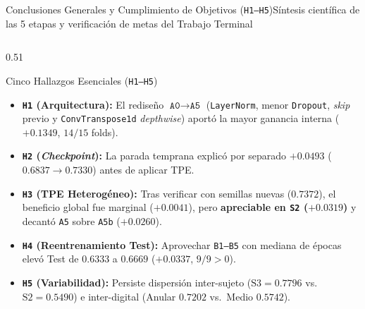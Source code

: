 
\begin{frame}{Conclusiones Generales y Cumplimiento de Objetivos (\texttt{H1--H5})}{S\'intesis cient\'ifica de las 5 etapas y verificaci\'on de metas del Trabajo Terminal}
  \begin{columns}[T,onlytextwidth]
    \begin{column}{0.51\textwidth}
      \scriptsize
      \begin{block}{Cinco Hallazgos Esenciales (\texttt{H1--H5})}
        \begin{itemize}\setlength{\itemsep}{2pt}
          \item \textbf{\texttt{H1} (Arquitectura):} El redise\~no $\texttt{A0}\to\texttt{A5}$ (\texttt{LayerNorm}, menor \texttt{Dropout}, \textit{skip} previo y \texttt{ConvTranspose1d} \textit{depthwise}) aport\'o la mayor ganancia interna ($\mathbf{+0.1349}$, $14/15$ folds).
          \item \textbf{\texttt{H2} (\textit{Checkpoint}):} La parada temprana explic\'o por separado $\mathbf{+0.0493}$ ($0.6837\to 0.7330$) antes de aplicar TPE.
          \item \textbf{\texttt{H3} (TPE Heterog\'eneo):} Tras verificar con semillas nuevas ($0.7372$), el beneficio global fue marginal ($\mathbf{+0.0041}$), pero \textbf{apreciable en \texttt{S2} ($\mathbf{+0.0319}$)} y decant\'o \texttt{A5} sobre \texttt{A5b} ($+0.0260$).
          \item \textbf{\texttt{H4} (Reentrenamiento Test):} Aprovechar \texttt{B1--B5} con mediana de \'epocas elev\'o Test de $0.6333$ a $\mathbf{0.6669}$ ($\mathbf{+0.0337}$, $9/9 > 0$).
          \item \textbf{\texttt{H5} (Variabilidad):} Persiste dispersi\'on inter-sujeto ($\text{S3}=0.7796$ vs.\ $\text{S2}=0.5490$) e inter-digital (Anular $0.7202$ vs.\ Medio $0.5742$).
        \end{itemize}
      \end{block}
    \end{column}


\end{columns}
\end{frame}

